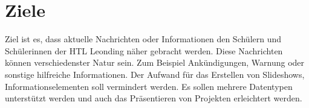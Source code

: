 \section{Ziele}
Ziel ist es, dass aktuelle Nachrichten oder Informationen den Schülern und Schülerinnen der HTL Leonding näher gebracht werden. Diese Nachrichten können verschiedenster Natur sein. Zum Beispiel Ankündigungen, Warnung oder sonstige hilfreiche Informationen.
Der Aufwand für das Erstellen von Slideshows, Informationselementen soll vermindert werden. Es sollen mehrere Datentypen unterstützt werden und auch das Präsentieren von Projekten erleichtert werden.

